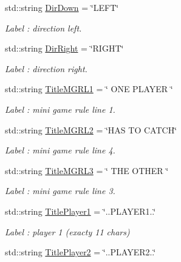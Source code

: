 \begin{DoxyCompactItemize}
std\-::string \hyperlink{struct_chase_game_1_1_s_lang_strings_acdb25c93c1bfd59df237ea8a9d3c1dff}{Dir\-Down} = \char`\"{}L\-E\-F\-T\char`\"{}
\begin{DoxyCompactList}\small\item\em Label \-: direction left. \end{DoxyCompactList}\item 
std\-::string \hyperlink{struct_chase_game_1_1_s_lang_strings_a72eca1e0efc7ab4c6900c4f75322f0dc}{Dir\-Right} = \char`\"{}R\-I\-G\-H\-T\char`\"{}
\begin{DoxyCompactList}\small\item\em Label \-: direction right. \end{DoxyCompactList}\item 
std\-::string \hyperlink{struct_chase_game_1_1_s_lang_strings_abdd2628446dc68073ab903fa6516747c}{Title\-M\-G\-R\-L1} = \char`\"{} O\-N\-E P\-L\-A\-Y\-E\-R \char`\"{}
\begin{DoxyCompactList}\small\item\em Label \-: mini game rule line 1. \end{DoxyCompactList}\item 
std\-::string \hyperlink{struct_chase_game_1_1_s_lang_strings_a0067f97060a17ea45752765221a80a7b}{Title\-M\-G\-R\-L2} = \char`\"{}H\-A\-S T\-O C\-A\-T\-C\-H\char`\"{}
\begin{DoxyCompactList}\small\item\em Label \-: mini game rule line 4. \end{DoxyCompactList}\item 
std\-::string \hyperlink{struct_chase_game_1_1_s_lang_strings_af09837dc3975dc46a32092fa63824a09}{Title\-M\-G\-R\-L3} = \char`\"{} T\-H\-E O\-T\-H\-E\-R \char`\"{}
\begin{DoxyCompactList}\small\item\em Label \-: mini game rule line 3. \end{DoxyCompactList}\item 
std\-::string \hyperlink{struct_chase_game_1_1_s_lang_strings_a95282707ee9c1c83bcb44ef4a167ba67}{Title\-Player1} = \char`\"{}..P\-L\-A\-Y\-E\-R1..\char`\"{}
\begin{DoxyCompactList}\small\item\em Label \-: player 1 (exacty 11 chars) \end{DoxyCompactList}\item 
std\-::string \hyperlink{struct_chase_game_1_1_s_lang_strings_a462589a11d9d088d7efdf6572c810c08}{Title\-Player2} = \char`\"{}..P\-L\-A\-Y\-E\-R2..\char`\"{}

\end{DoxyCompactItemize}
